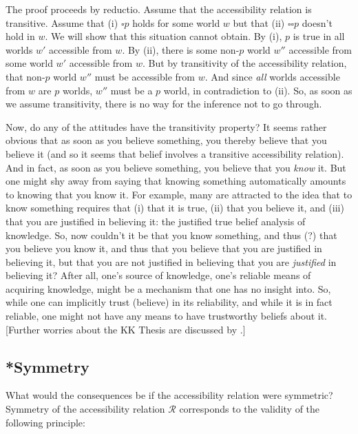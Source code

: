 The proof proceeds by reductio. Assume that the accessibility relation is
transitive. Assume that (i) $\square p$ holds for some world $w$ but that (ii)
$\square \square p$ doesn't hold in $w$. We will show that this situation cannot
obtain. By (i), $p$ is true in all worlds $w'$ accessible from $w$. By (ii),
there is some non-$p$ world $w''$ accessible from some world $w'$ accessible
from $w$. But by transitivity of the accessibility relation, that non-$p$ world
$w''$ must be accessible from $w$. And since \emph{all} worlds accessible from
$w$ are $p$ worlds, $w''$ must be a $p$ world, in contradiction to (ii). So, as
soon as we assume transitivity, there is no way for the inference not to go
through.

Now, do any of the attitudes have the transitivity property? It seems rather
obvious that as soon as you believe something, you thereby believe that you
believe it (and so it seems that belief involves a transitive accessibility
relation). And in fact, as soon as you believe something, you believe that you
\emph{know} it. But one might shy away from saying that knowing something
automatically amounts to knowing that you know it. For example, many are
attracted to the idea that to know something requires that (i) that it is true,
(ii) that you believe it, and (iii) that you are justified in believing it: the
justified true belief analysis of knowledge. So, now couldn't it be that you
know something, and thus (?) that you believe you know it, and thus that you
believe that you are justified in believing it, but that you are not justified
in believing that you are \emph{justified} in believing it? After all, one's
source of knowledge, one's reliable means of acquiring knowledge, might be a
mechanism that one has no insight into. So, while one can implicitly trust
(believe) in its reliability, and while it is in fact reliable, one might not
have any means to have trustworthy beliefs about it. [Further worries about the
KK Thesis are discussed by \citet{williamson:2000:limits}.]

\subsection{*Symmetry}

What would the consequences be if the accessibility relation were symmetric?
Symmetry of the accessibility relation $\mathcal{R}$ corresponds to the validity
of the following principle:

